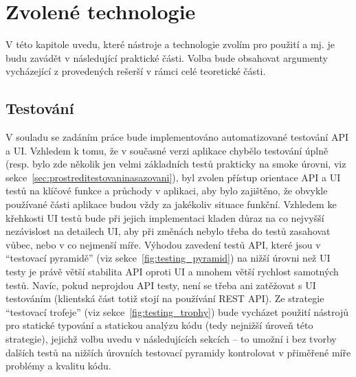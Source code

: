 \chapter{Zvolené technologie}

V této kapitole uvedu, které nástroje a technologie zvolím pro použití a mj. je budu zavádět v následující praktické části. Volba bude obsahovat argumenty vycházející z provedených rešerší v rámci celé teoretické části.

\section{Testování}

V souladu se zadáním práce bude implementováno automatizované testování API a UI. Vzhledem k tomu, že v současné verzi aplikace chybělo testování úplně (resp. bylo zde několik jen velmi základních testů prakticky na smoke úrovni, viz sekce~\ref{sec:prostreditestovaninasazovani}), byl zvolen přístup orientace API a UI testů na klíčové funkce a průchody v aplikaci, aby bylo zajištěno, že obvykle používané části aplikace budou vždy za jakékoliv situace funkční. Vzhledem ke křehkosti UI testů bude při jejich implementaci kladen důraz na co nejvyšší nezávislost na detailech UI, aby při změnách nebylo třeba do testů zasahovat vůbec, nebo v co nejmenší míře. Výhodou zavedení testů API, které jsou v \enquote{testovací pyramidě} (viz sekce~\ref{fig:testing_pyramid}) na nižší úrovni než UI testy je právě větší stabilita API oproti UI a mnohem větší rychlost samotných testů. Navíc, pokud neprojdou API testy, není se třeba ani zatěžovat s UI testováním (klientská část totiž stojí na používání REST API). Ze strategie \enquote{testovací trofeje} (viz sekce~\ref{fig:testing_trophy}) bude vycházet použití nástrojů pro statické typování a statickou analýzu kódu (tedy nejnižší úroveň této strategie), jejichž volbu uvedu v následujících sekcích -- to umožní i bez tvorby dalších testů na nižších úrovních testovací pyramidy kontrolovat v přiměřené míře problémy a kvalitu kódu.


